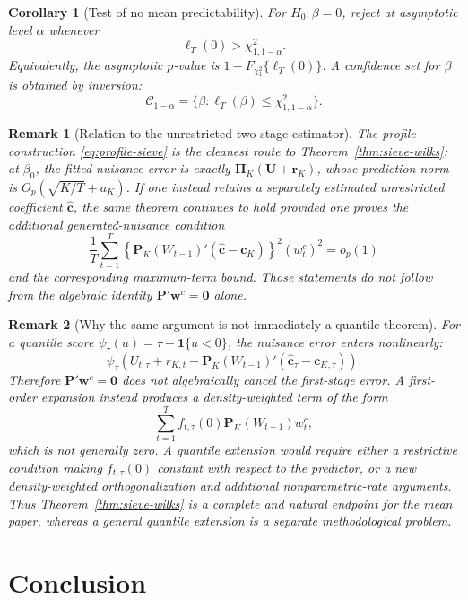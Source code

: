 \documentclass{article}
\newtheorem{corollary}{Corollary}
\newtheorem{remark}{Remark}
\begin{document}
\begin{corollary}[Test of no mean predictability]
\label{cor:mean-test}
For \(H_0:\beta=0\), reject at asymptotic level \(\alpha\) whenever
\[
    \ell_T(0)>\chi^2_{1,1-\alpha}.
\]
Equivalently, the asymptotic \(p\)-value is
\(1-F_{\chi_1^2}\{\ell_T(0)\}\).  A confidence set for \(\beta\) is obtained
by inversion:
\[
    \mathcal C_{1-\alpha}
      =\{\beta:\ell_T(\beta)\leq\chi^2_{1,1-\alpha}\}.
\]
\end{corollary}

\begin{remark}[Relation to the unrestricted two-stage estimator]
\label{rem:unrestricted-chat}
The profile construction \eqref{eq:profile-sieve} is the cleanest route to
Theorem~\ref{thm:sieve-wilks}: at \(\beta_0\), the fitted nuisance error is
exactly \(\bm\Pi_K(\bm U+\bm r_K)\), whose prediction norm is
\(O_p(\sqrt{K/T}+a_K)\).  If one instead retains a separately estimated
unrestricted coefficient \(\widehat{\bm c}\), the same theorem continues to
hold provided one proves the additional generated-nuisance condition
\[
    \frac1T\sum_{t=1}^T
       \left\{\bm P_K(W_{t-1})'
              (\widehat{\bm c}-\bm c_K)\right\}^2(w_t^c)^2=o_p(1)
\]
and the corresponding maximum-term bound.  Those statements do not follow
from the algebraic identity \(\bm P'\bm w^c=\bm0\) alone.
\end{remark}

\begin{remark}[Why the same argument is not immediately a quantile theorem]
\label{rem:quantile}
For a quantile score \(\psi_\tau(u)=\tau-\mathbf1\{u<0\}\), the nuisance error
enters nonlinearly:
\[
  \psi_\tau\!\left(U_{t,\tau}+r_{K,t}
       -\bm P_K(W_{t-1})'(\widehat{\bm c}_\tau-\bm c_{K,\tau})\right).
\]
Therefore \(\bm P'\bm w^c=\bm0\) does not algebraically cancel the first-stage
error.  A first-order expansion instead produces a density-weighted term of
the form
\[
  \sum_{t=1}^T f_{t,\tau}(0)
       \bm P_K(W_{t-1})w_t^c,
\]
which is not generally zero.  A quantile extension would require either a
restrictive condition making \(f_{t,\tau}(0)\) constant with respect to the
predictor, or a new density-weighted orthogonalization and additional
nonparametric-rate arguments.  Thus Theorem~\ref{thm:sieve-wilks} is a
complete and natural endpoint for the mean paper, whereas a general quantile
extension is a separate methodological problem.
\end{remark}

\section{Conclusion}
\end{document}
